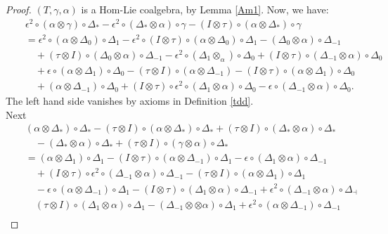 \documentclass{article}
\theoremstyle{definition}
\theoremstyle{remark}
\numberwithin{equation}{section}
\begin{document}
\begin{proof}
$(T, \gamma, \alpha)$ is a Hom-Lie coalgebra, by Lemma \ref{Am1}. Now, we have:
\begin{eqnarray}
 &&\epsilon^2\circ(\alpha\otimes\gamma)\circ\Delta_\ast-\epsilon^2\circ(\Delta_\ast\otimes\alpha)\circ\gamma-(I\otimes\tau)\circ(\alpha\otimes\Delta_\ast)\circ\gamma\nonumber\\
&&=\epsilon^2\circ(\alpha\otimes\Delta_0)\circ\Delta_1-\epsilon^2\circ(I\otimes\tau)\circ(\alpha\otimes\Delta_0)\circ\Delta_1-(\Delta_0\otimes\alpha)\circ\Delta_{-1}\nonumber\\
&&\quad+(\tau\otimes I)\circ(\Delta_0\otimes\alpha)\circ\Delta_{-1}-\epsilon^2\circ(\Delta_1\otimes_\alpha)\circ\Delta_0 +(I\otimes\tau)\circ(\Delta_{-1}\otimes\alpha)\circ\Delta_0\nonumber\\
&&\quad+\epsilon\circ(\alpha\otimes\Delta_1)\circ\Delta_0-(\tau\otimes I)\circ(\alpha\otimes\Delta_{-1})-(I\otimes\tau)\circ(\alpha\otimes\Delta_1)\circ\Delta_0\nonumber\\
&&\quad +(\alpha\otimes\Delta_{-1})\circ\Delta_0 + (I\otimes\tau)\circ\epsilon^2\circ(\Delta_1\otimes\alpha)\circ\Delta_0-\epsilon\circ(\Delta_{-1}\otimes\alpha)\circ\Delta_0.
\end{eqnarray}
The left hand side vanishes by axioms in Definition \ref{tdd}.\\
Next
 \begin{eqnarray}
  &&(\alpha\otimes\Delta_\ast)\circ\Delta_\ast-(\tau\otimes I)\circ(\alpha\otimes\Delta_\ast)\circ\Delta_\ast+(\tau\otimes I)\circ(\Delta_\ast\otimes\alpha)\circ\Delta_\ast\nonumber\\
&&\quad -(\Delta_\ast\otimes\alpha)\circ\Delta_\ast+(\tau\otimes I)\circ(\gamma\otimes\alpha)\circ\Delta_\ast\nonumber\\
&&=(\alpha\otimes\Delta_1)\circ\Delta_1-(I\otimes\tau)\circ(\alpha\otimes\Delta_{-1})\circ\Delta_1-\epsilon\circ(\Delta_1\otimes\alpha)\circ\Delta_{-1}\nonumber\\
&&\quad+(I\otimes\tau)\circ\epsilon^2\circ(\Delta_{-1}\otimes\alpha)\circ\Delta_{-1}-(\tau\otimes I)\circ(\alpha\otimes\Delta_1)\circ\Delta_1\nonumber\\
&&\quad-\epsilon\circ(\alpha\otimes\Delta_{-1})\circ\Delta_1-(I\otimes\tau)\circ(\Delta_1\otimes\alpha)\circ\Delta_{-1}+\epsilon^2\circ(\Delta_{-1}\otimes\alpha)\circ\Delta_\dashv\nonumber\\
&&\quad(\tau\otimes I)\circ(\Delta_1\otimes\alpha)\circ\Delta_1-(\Delta_{-1}\otimes\otimes\alpha)\circ\Delta_1+\epsilon^2\circ(\alpha\otimes\Delta_{-1})\circ\Delta_{-1}\nonumber\\

\end{eqnarray}
\end{proof}
\end{document}
